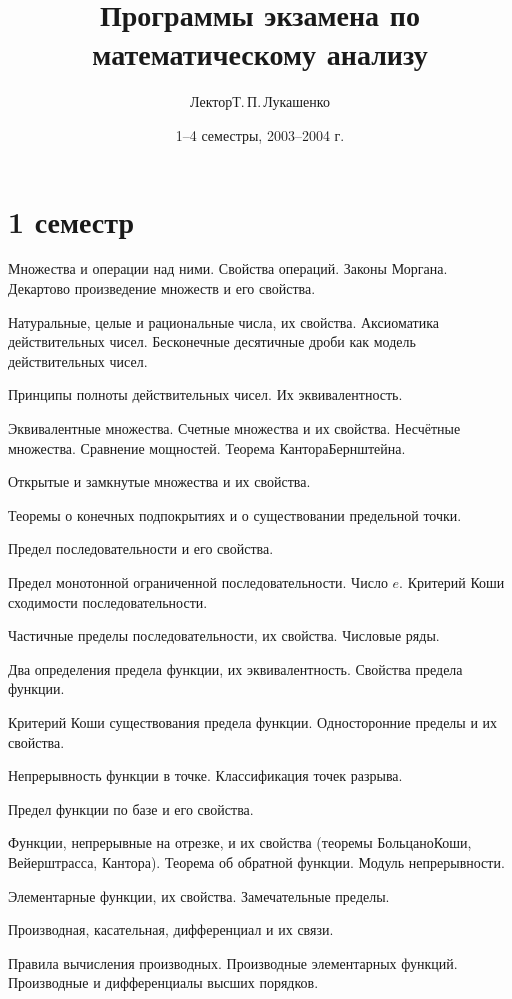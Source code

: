\documentclass[a4paper]{article}
\title{Программы экзамена по математическому анализу}
\author{Лектор\т Т.\,П.\,Лукашенко}
\date{1--4 семестры, 2003--2004 г.}
\begin{document}
\maketitle

\section*{1 семестр}

\begin{nums}{0}
\item Множества и операции над ними. Свойства операций. Законы Моргана. Декартово  произведение множеств и его свойства.
\item Натуральные, целые и рациональные числа, их свойства. Аксиоматика действительных чисел. Бесконечные десятичные
дроби как модель действительных чисел.
\item Принципы полноты действительных чисел. Их эквивалентность.
\item Эквивалентные множества. Счетные множества и их свойства. Несчётные множества. Сравнение мощностей. Теорема Кантора\ч Бернштейна.
\item Открытые и замкнутые множества и их свойства.
\item Теоремы о конечных подпокрытиях и о существовании предельной точки.
\item Предел последовательности и его свойства.
\item Предел монотонной ограниченной последовательности. Число $e$. Критерий Коши сходимости последовательности.
\item Частичные пределы последовательности, их свойства. Числовые ряды.
\item Два определения предела функции, их эквивалентность. Свойства предела функции.
\item Критерий Коши существования предела функции. Односторонние пределы и их свойства.
\item Непрерывность функции в точке. Классификация точек разрыва.
\item Предел функции по базе и его свойства.
\item Функции, непрерывные на отрезке, и их свойства (теоремы Больцано\ч Коши, Вейерштрасса, Кантора). Теорема об обратной функции.
Модуль непрерывности.
\item Элементарные функции, их свойства. Замечательные пределы.
\item Производная, касательная, дифференциал и их связи.
\item Правила вычисления производных. Производные элементарных функций. Производные и дифференциалы высших порядков.

\end{nums}
\end{document}
